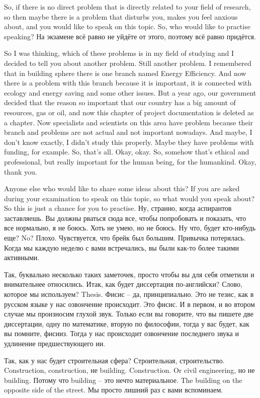 \documentclass[main.tex]{subfiles}
\begin{document}
So, if there is no direct problem that is directly related to your field of research, so then maybe there is a problem that disturbs you, makes you feel anxious about, and you would like to speak on this topic.
So, who would like to practise speaking?
На экзамене всё равно не уйдёте от этого, поэтому всё равно придётся.

So I was thinking, which of these problems is in my field of studying and I decided to tell you about another problem.
Still another problem.
I remembered that in building sphere there is one branch named Energy Efficiency.
And now there is a problem with this branch because it is important, it is connected with ecology and energy saving and some other issues.
But a year ago, our government decided that the reason so important that our country has a big amount of resources, gas or oil, and now this chapter of project documentation is deleted as a chapter.
Now specialists and scientists on this area have problem because their branch and problems are not actual and not important nowadays.
And maybe, I don't know exactly, I didn't study this properly.
Maybe they have problems with funding, for example.
So, that's all.
Okay, okay.
So, somehow that's ethical and professional, but really important for the human being, for the humankind.
Okay, thank you.

Anyone else who would like to share some ideas about this?
If you are asked during your examination to speak on this topic, so what would you speak about?
So this is just a chance for you to practise.
Ну, странно, когда аспирантов заставляешь.
Вы должны рваться сюда все, чтобы попробовать и показать, что все нормально, я не боюсь.
Хоть не умею, но не боюсь.
Ну что, будет кто-нибудь еще?
No?
Плохо.
Чувствуется, что брейк был большим.
Привычка потерялась.
Когда мы каждую неделю с вами встречались, вы были как-то более такими активными.

Так, буквально несколько таких заметочек, просто чтобы вы для себя отметили и внимательнее относились.
Итак, как будет диссертация по-английски?
Слово, которое мы используем?
Thesis.
Фисис -- да, принципиально.
Это не тезис, как в русском языке у нас озвончение происходит.
Это фисис.
И в первом, и во втором случае мы произносим глухой звук.
Только если вы говорите, что вы пишете две диссертации, одну по математике, вторую по философии, тогда у вас будет, как вы помните, фисииз.
Тогда у нас происходит озвончение последнего звука и удлинение предшествующего ии.

Так, как у нас будет строительная сфера?
Строительная, строительство.
Construction, construction, не building.
Construction.
Or civil engineering, но не building.
Потому что building -- это нечто материальное.
The building on the opposite side of the street.
Мы просто лишний раз с вами вспоминаем.
\end{document}
